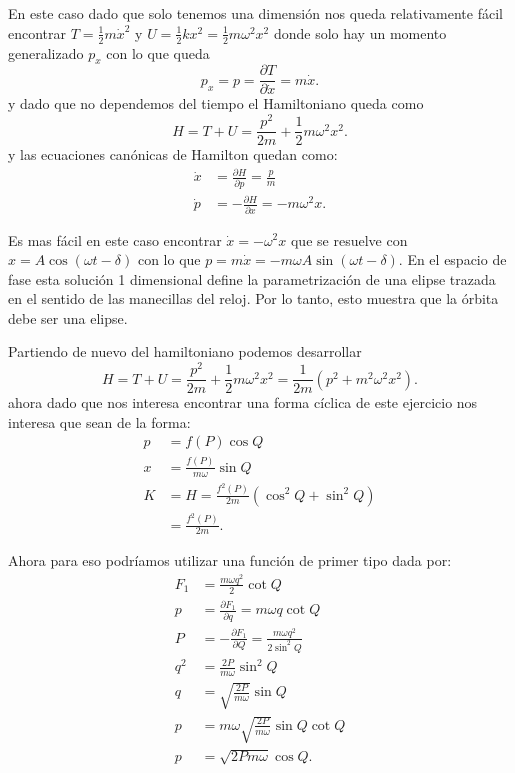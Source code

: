 \documentclass{report}
\begin{document}
\chapter{}

En este caso dado que solo tenemos una dimensión nos queda relativamente fácil encontrar $T = \frac{1}{2}m \dot{x}^2$ y $U = \frac{1}{2}kx^2 = \frac{1}{2}m\omega^2x^2$ donde solo hay un momento generalizado $p_x$ con lo que queda \[
p_x = p = \frac{\partial T}{\partial \dot{x}} = m \dot{x}
.\] y dado que no dependemos del tiempo el Hamiltoniano queda como \[
H = T + U = \frac{p^2}{2m} + \frac{1}{2}m\omega^2x^2
.\] y las ecuaciones canónicas de Hamilton quedan como:
\begin{align*}
  \dot{x} &= \frac{\partial H}{\partial p} = \frac{p}{m}\\
  \dot{p} &= - \frac{\partial H}{\partial x} = - m\omega^2x
.\end{align*}

Es mas fácil en este caso encontrar $\dot{x} = -\omega^2x$ que se resuelve con $x = A\cos\left( \omega t - \delta \right) $ con lo que $p = m\dot{x} = -m\omega A\sin\left( \omega t - \delta \right) $.  En el espacio de fase esta solución 1 dimensional define la parametrización de una elipse trazada en el sentido de las manecillas del reloj. Por lo tanto, esto muestra que la órbita debe ser una elipse.

Partiendo de nuevo del hamiltoniano podemos desarrollar \[
H = T + U = \frac{p^2}{2m} + \frac{1}{2}m\omega^2x^2 = \frac{1}{2m}\left( p^2 + m^2\omega^2x^2 \right) 
.\] ahora dado que nos interesa encontrar una forma cíclica de este ejercicio nos interesa que sean de la forma:
\begin{align*}
  p &= f\left( P \right) \cos Q\\
  x &= \frac{f\left( P \right) }{m\omega}\sin Q\\
  K &= H = \frac{f^2\left( P \right) }{2m}\left( \cos^2 Q + \sin^2 Q \right)  \\
  &= \frac{f^2\left( P \right) }{2m}
.\end{align*}

Ahora para eso podríamos utilizar una función de primer tipo dada por:
\begin{align*}
  F_1 &= \frac{m\omega q^2}{2}\cot Q \\
  p &= \frac{\partial F_1}{\partial q} = m\omega q \cot Q \\
  P &= - \frac{\partial F_1}{\partial Q} = \frac{m\omega q^2}{2\sin^2 Q} \\
  q^2 &= \frac{2P}{m\omega}\sin^2 Q \\
  q &= \sqrt{\frac{2P}{m\omega}} \sin Q\\
  p &= m\omega \sqrt{\frac{2P}{m\omega}} \sin Q \cot Q \\
  p &= \sqrt{2Pm\omega} \cos Q
.\end{align*}
\end{document}
